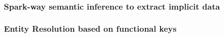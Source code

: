 \subsubsection{Spark-way semantic inference to extract implicit data}
\subsubsection{Entity Resolution based on functional keys}






